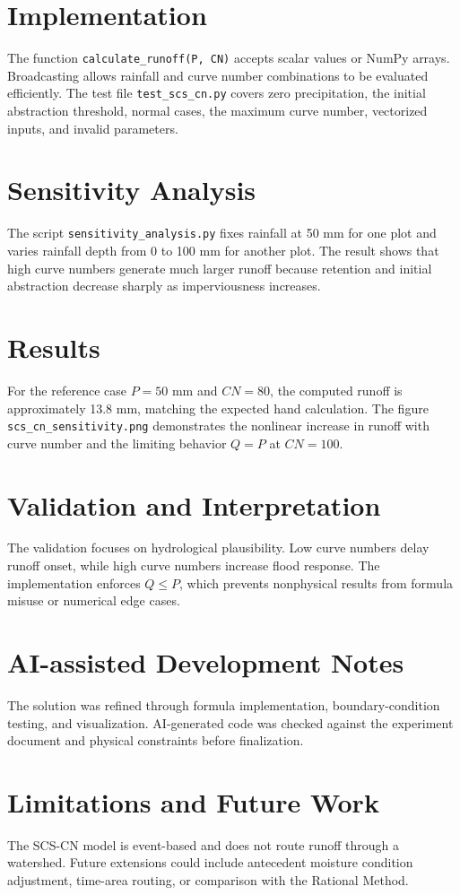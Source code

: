 \documentclass[11pt]{article}
\begin{document}
\section*{Implementation}
The function \texttt{calculate\_runoff(P, CN)} accepts scalar values or NumPy arrays. Broadcasting allows rainfall and curve number combinations to be evaluated efficiently. The test file \texttt{test\_scs\_cn.py} covers zero precipitation, the initial abstraction threshold, normal cases, the maximum curve number, vectorized inputs, and invalid parameters.

\section*{Sensitivity Analysis}
The script \texttt{sensitivity\_analysis.py} fixes rainfall at 50 mm for one plot and varies rainfall depth from 0 to 100 mm for another plot. The result shows that high curve numbers generate much larger runoff because retention and initial abstraction decrease sharply as imperviousness increases.

\section*{Results}
For the reference case $P=50$ mm and $CN=80$, the computed runoff is approximately 13.8 mm, matching the expected hand calculation. The figure \texttt{scs\_cn\_sensitivity.png} demonstrates the nonlinear increase in runoff with curve number and the limiting behavior $Q=P$ at $CN=100$.

\section*{Validation and Interpretation}
The validation focuses on hydrological plausibility. Low curve numbers delay runoff onset, while high curve numbers increase flood response. The implementation enforces $Q \le P$, which prevents nonphysical results from formula misuse or numerical edge cases.

\section*{AI-assisted Development Notes}
The solution was refined through formula implementation, boundary-condition testing, and visualization. AI-generated code was checked against the experiment document and physical constraints before finalization.

\section*{Limitations and Future Work}
The SCS-CN model is event-based and does not route runoff through a watershed. Future extensions could include antecedent moisture condition adjustment, time-area routing, or comparison with the Rational Method.
\end{document}

